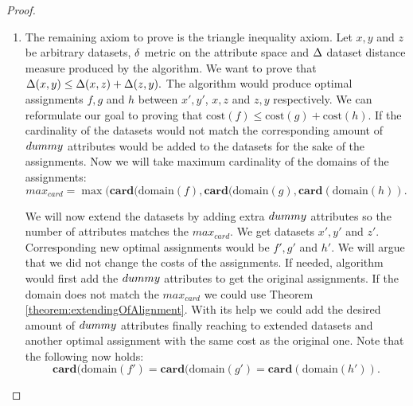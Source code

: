 \begin{theorem}
\begin{proof}
\begin{enumerate}
		\item The remaining axiom to prove is the triangle inequality axiom. Let $x,y$ and $z$ be arbitrary datasets, $\delta$ metric on the attribute space and $\Delta$ dataset distance measure produced by the algorithm. We want to prove that $\Delta(x,y)\le \Delta(x,z) + \Delta(z,y).$ The algorithm would produce optimal assignments $f,g$ and $h$ between $x',y'$, $x,z$ and $z, y$ respectively. We can reformulate our goal to proving that  $\text{cost}(f) \le \text{cost}(g) +  \text{cost}(h).$ If the cardinality of the datasets would not match the corresponding amount of $dummy$ attributes would be added to the datasets for the sake of the assignments. Now we will take maximum cardinality of the domains of the assignments:  $$max_{card}=\max(\mathbf{card}(\text{domain}(f),\mathbf{card}(\text{domain}(g),\mathbf{card}(\text{domain}(h)).$$
		
		We will now extend the datasets by adding extra $dummy$ attributes so the number of attributes matches the $max_{card}.$ We get datasets $x', y'$ and $z'$.
		Corresponding new optimal assignments would be $f',g'$ and $h'$. We will argue that we did not change the costs of the assignments. If needed, algorithm would first add the $dummy$ attributes to get the original assignments. If the domain does not match the $max_{card}$ we could use Theorem \ref{theorem:extendingOfAlignment}. With its help we could add the desired amount of $dummy$ attributes finally reaching to extended datasets and another optimal assignment with the same cost as the original one. Note that the following now holds: $$\mathbf{card}(\text{domain}(f')=\mathbf{card}(\text{domain}(g')=\mathbf{card}(\text{domain}(h')).$$
		

\end{enumerate}
\end{proof}
\end{theorem}
